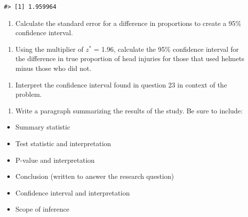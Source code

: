 \documentclass[
]{report}
\providecommand{\tightlist}{%
  \setlength{\itemsep}{0pt}\setlength{\parskip}{0pt}}
\begin{document}
\begin{verbatim}
#> [1] 1.959964
\end{verbatim}

\begin{enumerate}
\def\labelenumi{\arabic{enumi}.}
\setcounter{enumi}{21}
\tightlist
\item
  Calculate the standard error for a difference in proportions to create a 95\% confidence interval.
\end{enumerate}

\vspace{1in}

\begin{enumerate}
\def\labelenumi{\arabic{enumi}.}
\setcounter{enumi}{22}
\tightlist
\item
  Using the multiplier of \(z^*\) = 1.96, calculate the 95\% confidence interval for the difference in true proportion of head injuries for those that used helmets minus those who did not.
\end{enumerate}

\vspace{1in}

\begin{enumerate}
\def\labelenumi{\arabic{enumi}.}
\setcounter{enumi}{23}
\tightlist
\item
  Interpret the confidence interval found in question 23 in context of the problem.
\end{enumerate}

\vspace{1in}

\begin{enumerate}
\def\labelenumi{\arabic{enumi}.}
\setcounter{enumi}{24}
\tightlist
\item
  Write a paragraph summarizing the results of the study. Be sure to include:
\end{enumerate}

\begin{itemize}
\item
  Summary statistic
\item
  Test statistic and interpretation
\item
  P-value and interpretation
\item
  Conclusion (written to answer the research question)
\item
  Confidence interval and interpretation
\item
  Scope of inference
\end{itemize}
\end{document}
